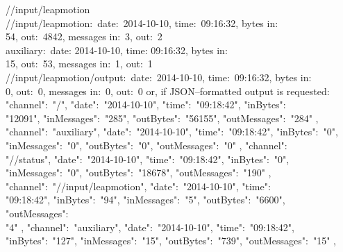 /\serviceName/input/leapmotion\\
\settowidth{\uL}{/output}%
\hspace*{\uL}/\serviceName/input/leapmotion:\ \openSq{}date:\ 2014-10-10, time:\
09:16:32, bytes in:\ \\
\settowidth{\uL}{/xservicx/input/leapmotion/output: }%
\hspace*{\uL}54, out:\ 4842, messages in:\ 3, out:\ 2\closeSq\\
\settowidth{\uL}{/xservicx/input/leapmoti}%
\hspace*{\uL}auxiliary:\ \openSq{}date: 2014-10-10, time: 09:16:32, bytes in:\ \\
\settowidth{\uL}{/xservicx/input/leapmotion/output: }%
\hspace*{\uL}15, out:\ 53, messages in:\ 1, out:\ 1\closeSq\\
/\serviceName/input/leapmotion/output:\ \openSq{}date:\ 2014-10-10, time:\ 09:16:32, bytes
in:\ \\
\hspace*{\uL}0, out:\ 0, messages in:\ 0, out:\ 0\closeSq
\outputEnd{}
or, if JSON--formatted output is requested:
\outputBegin{}
\openSq{} \openSq{} \textbraceleft{} "channel":\ "/\dollarService", "date":\
"2014-10-10", "time":\ "09:18:42", "inBytes":\ \\
"12091", "inMessages":\ "285", "outBytes":\ "56155", "outMessages":\ "284"
\textbraceright, \textbraceleft\\
"channel":\ "auxiliary", "date":\ "2014-10-10", "time":\ "09:18:42", "inBytes":\ "0",\\
"inMessages":\ "0", "outBytes":\ "0", "outMessages":\ "0" \textbraceright,
\textbraceleft{} "channel":\ \\
"/\dollarService/status", "date":\ "2014-10-10", "time":\ "09:18:42", "inBytes":\
"0",\\
"inMessages":\ "0", "outBytes":\ "18678", "outMessages":\ "190" \textbraceright{}
\closeSq,\\
\openSq{} \textbraceleft{} "channel":\ "/\serviceName/input/leapmotion", "date":\
"2014-10-10", "time":\ \\
"09:18:42", "inBytes":\ "94", "inMessages":\ "5", "outBytes":\ "6600", "outMessages":\ \\
"4" \textbraceright, \textbraceleft{} "channel":\ "auxiliary", "date":\ "2014-10-10",
"time":\ "09:18:42",\\
"inBytes":\ "127", "inMessages":\ "15", "outBytes":\ "739", "outMessages":\ "15"
\textbraceright,\\
